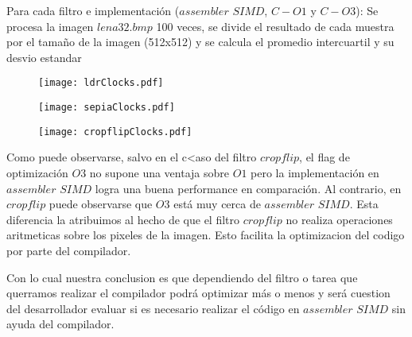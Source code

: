 Para cada filtro e implementación ($assembler$ $SIMD$, $C-O1$ y $C-O3$): Se procesa la imagen $lena32.bmp$ 100 veces, se divide el resultado de cada muestra por el tamaño de la imagen (512x512) y se calcula el promedio intercuartil y su desvio estandar

\begin{figure}[h]
  \begin{center}
	\texttt{[image: ldrClocks.pdf]}
  \end{center}
\end{figure}

\begin{figure}[h]
  \begin{center}
	\texttt{[image: sepiaClocks.pdf]}
  \end{center}
\end{figure}


\begin{figure}[h]
  \begin{center}
	\texttt{[image: cropflipClocks.pdf]}
  \end{center}
\end{figure}

Como puede observarse, salvo en el c<aso del filtro $cropflip$, el flag de optimización $O3$ no supone una ventaja sobre $O1$ pero la implementación en $assembler$ $SIMD$ logra una buena performance en comparación. Al contrario, en $cropflip$ puede observarse que $O3$ está muy cerca de $assembler$ $SIMD$. Esta diferencia la atribuimos al hecho de que el filtro $cropflip$ no realiza operaciones aritmeticas sobre los pixeles de la imagen. Esto facilita la optimizacion del codigo por parte del compilador. 

Con lo cual nuestra conclusion es que dependiendo del filtro o tarea que querramos realizar el compilador podrá optimizar más o menos y será cuestion del desarrollador evaluar si es necesario realizar el código en $assembler$ $SIMD$ sin ayuda del compilador. 

